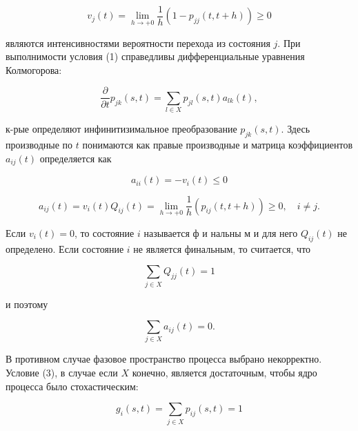 \documentclass[10pt]{article}
\begin{document}
\[

v_{j}(t)=\lim _{h \rightarrow+0} \frac{1}{h}\left(1-p_{j j}(t, t+h)\right) \geqslant 0

\]



являются интенсивностями вероятности перехода из состояния $j$. При выполнимости условия (1) справедливы дифференциальные уравнения Колмогорова:



\[

\frac{\partial}{\partial t} p_{j k}(s, t)=\sum_{l \in X} p_{j l}(s, t) a_{l k}(t),

\]



к-рые определяют инфинитизимальное преобразование $p_{j k}(s, t)$. Здесь производные по $t$ понимаются как правые производные и матрица коэффициентов $a_{i j}(t)$ определяется как



\[

a_{i i}(t)=-v_{i}(t) \leqslant 0

\]



\[

a_{i j}(t)=v_{i}(t) Q_{i j}(t)=\lim _{h \rightarrow+0} \frac{1}{h}\left(p_{i j}(t, t+h)\right) \geqslant 0, \quad i \neq j .

\]



Если $v_{i}(t)=0$, то состояние $i$ называется ф и нальны м и для него $Q_{i j}(t)$ не определено. Если состояние $i$ не является финальным, то считается, что



\[

\sum_{j \in X} Q_{j j}(t)=1

\]



и поэтому



\[

\sum_{j \in X} a_{i j}(t)=0 .

\]



В противном случае фазовое пространство процесса выбрано некорректно. Условие (3), в случае если $X$ конечно, является достаточным, чтобы ядро процесса было стохастическим:



\[

g_{i}(s, t)=\sum_{j \in X} p_{i j}(s, t)=1

\]
\end{document}
